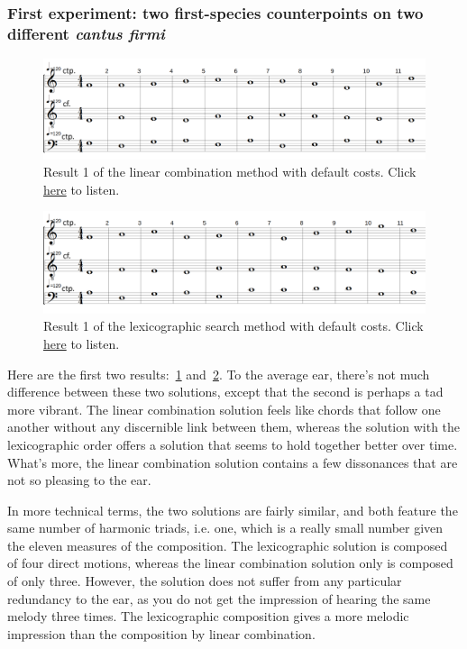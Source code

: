 \subsubsection{First experiment: two first-species counterpoints on two different \textit{cantus firmi}}
\begin{figure}[h]
    \centering
    \includegraphics[width=1\textwidth]{Images/Experiments/linear-combination-1sp.png}
    \caption{Result 1 of the linear combination method with default costs. Click \href{https://example.com/}{here} to listen.}
    \label{fig:combili-1sp}
\end{figure}

\begin{figure}[h]
    \centering
    \includegraphics[width=1\textwidth]{Images/Experiments/basic-lexico-1sp.png}
    \caption{Result 1 of the lexicographic search method with default costs. Click \href{https://youtu.be/wh1bXyVt5LI}{here} to listen.}
    \label{fig:lexico-1sp}
\end{figure}

Here are the first two results:~\ref{fig:combili-1sp} and~\ref{fig:lexico-1sp}. To the average ear, there's not much difference between these two solutions, except that the second is perhaps a tad more vibrant. The linear combination solution feels like chords that follow one another without any discernible link between them, whereas the solution with the lexicographic order offers a solution that seems to hold together better over time. What's more, the linear combination solution contains a few dissonances that are not so pleasing to the ear.

In more technical terms, the two solutions are fairly similar, and both feature the same number of harmonic triads, i.e. one, which is a really small number given the eleven measures of the composition. The lexicographic solution is composed of four direct motions, whereas the linear combination solution only is composed of only three. However, the solution does not suffer from any particular redundancy to the ear, as you do not get the impression of hearing the same melody three times. The lexicographic composition gives a more melodic impression than the composition by linear combination.

